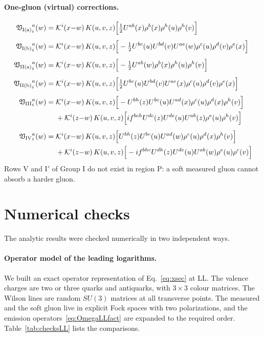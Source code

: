 \documentclass[aps,prd,onecolumn,superscriptaddress,nofootinbib,floatfix,longbibliography,11pt]{revtex4-2}
\numberwithin{equation}{section}
\newcommand{\KK}{\mathcal{K}}
\begin{document}
\paragraph*{One-gluon (virtual) corrections.}
{\small
\begin{align}
{\mathfrak V_{\rm I(a)}}^{a}_{i}(w)=\;&\KK^{i}(x{-}w)\,K(u,v,z)\Big[\tfrac{1}{2}U^{ab}(x)\rho^{b}(x)\rho^{h}(u)\rho^{h}(v)\Big]\label{eq:LLP1PI_Nafter}
\\[4pt]
{\mathfrak V_{\rm I(b)}}^{a}_{i}(w)=\;&\KK^{i}(x{-}w)\,K(u,v,z)\Big[-\tfrac{1}{2}U^{bc}(u)U^{bd}(v)U^{ae}(w)\rho^{c}(u)\rho^{d}(v)\rho^{e}(x)\Big]\label{eq:LLP1PI_Nbarbefore}
\\[4pt]
{\mathfrak V_{\rm II(a)}}^{a}_{i}(w)=\;&\KK^{i}(x{-}w)\,K(u,v,z)\Big[-\tfrac{1}{2}U^{ab}(w)\rho^{b}(x)\rho^{h}(u)\rho^{h}(v)\Big]\label{eq:LLP1PII_A3}
\\[4pt]
{\mathfrak V_{\rm II(b)}}^{a}_{i}(w)=\;&\KK^{i}(x{-}w)\,K(u,v,z)\Big[\tfrac{1}{2}U^{bc}(u)U^{bd}(v)U^{ae}(x)\rho^{c}(u)\rho^{d}(v)\rho^{e}(x)\Big]\label{eq:LLP1PII_A3bar}
\\[4pt]
{\mathfrak V_{\rm III}}^{a}_{i}(w)=\;&\KK^{i}(x{-}w)\,K(u,v,z)\Big[-U^{bh}(z)U^{bc}(u)U^{ad}(x)\rho^{c}(u)\rho^{d}(x)\rho^{h}(v)\Big]\notag\\
&+\KK^{i}(z{-}w)\,K(u,v,z)\Big[if^{bch}U^{dc}(z)U^{de}(u)U^{ab}(z)\rho^{e}(u)\rho^{h}(v)\Big]\label{eq:LLP1PIII}
\\[4pt]
{\mathfrak V_{\rm IV}}^{a}_{i}(w)=\;&\KK^{i}(x{-}w)\,K(u,v,z)\Big[U^{bh}(z)U^{bc}(u)U^{ad}(w)\rho^{c}(u)\rho^{d}(x)\rho^{h}(v)\Big]\notag\\
&+\KK^{i}(z{-}w)\,K(u,v,z)\Big[-if^{bhc}U^{dh}(z)U^{de}(u)U^{ab}(w)\rho^{e}(u)\rho^{c}(v)\Big]\label{eq:LLP1PIV}
\end{align}
}
Rows V and I$'$ of Group I do not exist in region P: a soft measured gluon cannot absorb a harder gluon.
\section{Numerical checks}\label{app:checks}

The analytic results were checked numerically in two independent ways.

\paragraph*{Operator model of the leading logarithms.} We built an exact operator representation of Eq.~\eqref{eq:xsec} at LL. The valence charges are two or three quarks and antiquarks, with $3\times3$ colour matrices. The Wilson lines are random $SU(3)$ matrices at all transverse points. The measured and the soft gluon live in explicit Fock spaces with two polarizations, and the emission operators~\eqref{eq:OmegaLLfact} are expanded to the required order. Table~\ref{tab:checksLL} lists the comparisons.
\end{document}
